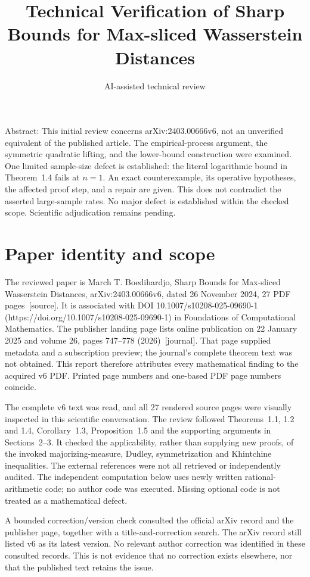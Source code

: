 \documentclass[10pt]{article}
\title{Technical Verification of
Sharp Bounds for Max-sliced Wasserstein Distances}
\author{AI-assisted technical review}
\date{}
\begin{document}
\maketitle
Abstract: This initial review concerns arXiv:2403.00666v6, not an unverified equivalent of the published article. The empirical-process argument, the symmetric quadratic lifting, and the lower-bound construction were examined. One limited sample-size defect is established: the literal logarithmic bound in Theorem 1.4 fails at \(n=1\). An exact counterexample, its operative hypotheses, the affected proof step, and a repair are given. This does not contradict the asserted large-sample rates. No major defect is established within the checked scope. Scientific adjudication remains pending.\par
\section*{Paper identity and scope}
The reviewed paper is March T. Boedihardjo, Sharp Bounds for Max-sliced Wasserstein Distances, arXiv:2403.00666v6, dated 26 November 2024, 27 PDF pages [source]. It is associated with DOI 10.1007/s10208-025-09690-1 (https://doi.org/10.1007/s10208-025-09690-1) in Foundations of Computational Mathematics. The publisher landing page lists online publication on 22 January 2025 and volume 26, pages 747–778 (2026) [journal]. That page supplied metadata and a subscription preview; the journal’s complete theorem text was not obtained. This report therefore attributes every mathematical finding to the acquired v6 PDF. Printed page numbers and one-based PDF page numbers coincide.\par
The complete v6 text was read, and all 27 rendered source pages were visually inspected in this scientific conversation. The review followed Theorems 1.1, 1.2 and 1.4, Corollary 1.3, Proposition 1.5 and the supporting arguments in Sections 2–3. It checked the applicability, rather than supplying new proofs, of the invoked majorizing-measure, Dudley, symmetrization and Khintchine inequalities. The external references were not all retrieved or independently audited. The independent computation below uses newly written rational-arithmetic code; no author code was executed. Missing optional code is not treated as a mathematical defect.\par
A bounded correction/version check consulted the official arXiv record and the publisher page, together with a title-and-correction search. The arXiv record still listed v6 as its latest version. No relevant author correction was identified in these consulted records. This is not evidence that no correction exists elsewhere, nor that the published text retains the issue.\par
\end{document}
